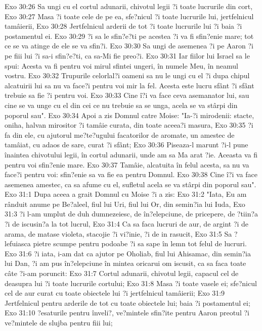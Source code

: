 Exo 30:26  Sa ungi cu el cortul adunarii, chivotul legii ?i toate lucrurile din cort,
Exo 30:27  Masa ?i toate cele de pe ea, sfe?nicul ?i toate lucrurile lui, jertfelnicul tamâierii,
Exo 30:28  Jertfelnicul arderii de tot ?i toate lucrurile lui ?i baia ?i postamentul ei.
Exo 30:29  ?i sa le sfin?e?ti pe acestea ?i va fi sfin?enie mare; tot ce se va atinge de ele se va sfin?i.
Exo 30:30  Sa ungi de asemenea ?i pe Aaron ?i pe fiii lui ?i sa-i sfin?e?ti, ca sa-Mi fie preo?i.
Exo 30:31  Iar fiilor lui Israel sa le spui: Acesta va fi pentru voi mirul sfintei ungeri, în numele Meu, în neamul vostru.
Exo 30:32  Trupurile celorlal?i oameni sa nu le ungi cu el ?i dupa chipul alcatuirii lui sa nu va face?i pentru voi mir la fel. Acesta este lucru sfânt ?i sfânt trebuie sa fie ?i pentru voi.
Exo 30:33  Cine î?i va face ceva asemanator lui, sau cine se va unge cu el din cei ce nu trebuie sa se unga, acela se va stârpi din poporul sau".
Exo 30:34  Apoi a zis Domnul catre Moise: "Ia-?i mirodenii: stacte, oniha, halvan mirositor ?i tamâie curata, din toate aceea?i masura,
Exo 30:35  ?i fa din ele, cu ajutorul me?te?ugului facatorilor de aromate, un amestec de tamâiat, cu adaos de sare, curat ?i sfânt;
Exo 30:36  Piseaza-l marunt ?i-l pune înaintea chivotului legii, în cortul adunarii, unde am sa Ma arat ?ie. Aceasta va fi pentru voi sfin?enie mare.
Exo 30:37  Tamâie, alcatuita în felul acesta, sa nu va face?i pentru voi: sfin?enie sa va fie ea pentru Domnul.
Exo 30:38  Cine î?i va face asemenea amestec, ca sa afume cu el, sufletul acela se va stârpi din poporul sau".
Exo 31:1  Dupa aceea a grait Domnul cu Moise ?i a zis:
Exo 31:2  "Iata, Eu am rânduit anume pe Be?aleel, fiul lui Uri, fiul lui Or, din semin?ia lui Iuda,
Exo 31:3  ?i l-am umplut de duh dumnezeiesc, de în?elepciune, de pricepere, de ?tiin?a ?i de iscusin?a la tot lucrul,
Exo 31:4  Ca sa faca lucruri de aur, de argint ?i de arama, de matase violeta, stacojie ?i vi?inie, ?i de in rasucit,
Exo 31:5  Sa ?lefuiasca pietre scumpe pentru podoabe ?i sa sape în lemn tot felul de lucruri.
Exo 31:6  ?i iata, i-am dat ca ajutor pe Oholiab, fiul lui Ahisamac, din semin?ia lui Dan, ?i am pus în?elepciune în mintea oricarui om iscusit, ca sa faca toate câte ?i-am poruncit:
Exo 31:7  Cortul adunarii, chivotul legii, capacul cel de deasupra lui ?i toate lucrurile cortului;
Exo 31:8  Masa ?i toate vasele ei; sfe?nicul cel de aur curat cu toate obiectele lui ?i jertfelnicul tamâierii;
Exo 31:9  Jertfelnicul pentru arderile de tot cu toate obiectele lui; baia ?i postamentul ei;
Exo 31:10  ?esaturile pentru înveli?, ve?mintele sfin?ite pentru Aaron preotul ?i ve?mintele de slujba pentru fiii lui;
